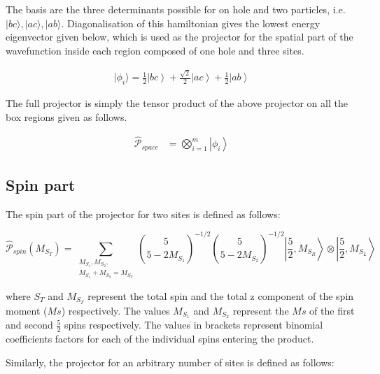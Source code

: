 \documentclass[12pt,twoside]{report}
\begin{document}
	The basis are the three determinants possible for on hole and two particles,
	i.e. $|bc\rangle,|ac\rangle,|ab\rangle$.  Diagonalisation of this
	hamiltonian gives the lowest energy eigenvector given below, which is used
	as the projector for the spatial part of the wavefunction inside each region
	composed of one hole and three sites.

	\begin{equation}
		\begin{split}
		  |\phi_{i}\rangle = \frac{1}{2}\left| bc\right\rangle +
\frac{\sqrt{2}}{2}\left| ac\right\rangle +
\frac{1}{2}\left| ab\right\rangle
		\end{split}
		\label{eq:demodel}
	\end{equation}


	The full projector is simply the tensor product of the above projector
	on all the box regions given as follows.

	\begin{equation}
		\begin{split}
			\hat{\mathcal{P}}_{space} & = \bigotimes_{i = 1}^{m}\left|\phi_i\right\rangle
		\end{split}
		\label{eq:demodel}
	\end{equation}

	\subsection{Spin part}

	The spin part of the projector for two sites is defined as follows:


	\begin{equation}
			\hat{\mathcal{P}}_{spin}(M_{S_T})  = \sum_{\substack{M_{S_1},M_{S_2}, \\ M_{S_1}+M_{S_2}=M_{S_T}}}
			\binom{5}{5 - 2 M_{S_1}}^{-1/2}\binom{5}{5 - 2 M_{S_2}}^{-1/2}
			\left |\frac{5}{2},M_{S_R}\right\rangle\otimes\left|\frac{5}{2},M_{S_L}\right\rangle
		\label{eq:demodel}
	\end{equation}

	where $S_T$ and $M_{S_T}$ represent the total spin and the total z component
	of the spin moment ($Ms$) respectively. The values $M_{S_1}$ and $M_{S_2}$
	represent the $Ms$ of the first and second $\frac{5}{2}$ spins respectively.
	The values in brackets represent binomial coefficients factors for each of the
	individual spins entering the product.

	Similarly, the projector for an arbitrary number of sites is defined
	as follows:
\end{document}
